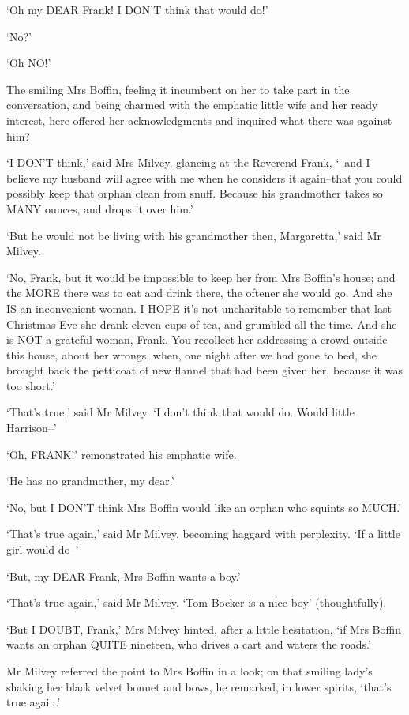 ‘Oh my DEAR Frank! I DON’T think that would do!’

‘No?’

‘Oh NO!’

The smiling Mrs Boffin, feeling it incumbent on her to take part in the
conversation, and being charmed with the emphatic little wife and her
ready interest, here offered her acknowledgments and inquired what there
was against him?

‘I DON’T think,’ said Mrs Milvey, glancing at the Reverend Frank, ‘--and
I believe my husband will agree with me when he considers it again--that
you could possibly keep that orphan clean from snuff. Because his
grandmother takes so MANY ounces, and drops it over him.’

‘But he would not be living with his grandmother then, Margaretta,’ said
Mr Milvey.

‘No, Frank, but it would be impossible to keep her from Mrs Boffin’s
house; and the MORE there was to eat and drink there, the oftener she
would go. And she IS an inconvenient woman. I HOPE it’s not uncharitable
to remember that last Christmas Eve she drank eleven cups of tea, and
grumbled all the time. And she is NOT a grateful woman, Frank. You
recollect her addressing a crowd outside this house, about her wrongs,
when, one night after we had gone to bed, she brought back the petticoat
of new flannel that had been given her, because it was too short.’

‘That’s true,’ said Mr Milvey. ‘I don’t think that would do. Would
little Harrison--’

‘Oh, FRANK!’ remonstrated his emphatic wife.

‘He has no grandmother, my dear.’

‘No, but I DON’T think Mrs Boffin would like an orphan who squints so
MUCH.’

‘That’s true again,’ said Mr Milvey, becoming haggard with perplexity.
‘If a little girl would do--’

‘But, my DEAR Frank, Mrs Boffin wants a boy.’

‘That’s true again,’ said Mr Milvey. ‘Tom Bocker is a nice boy’
(thoughtfully).

‘But I DOUBT, Frank,’ Mrs Milvey hinted, after a little hesitation, ‘if
Mrs Boffin wants an orphan QUITE nineteen, who drives a cart and waters
the roads.’

Mr Milvey referred the point to Mrs Boffin in a look; on that smiling
lady’s shaking her black velvet bonnet and bows, he remarked, in lower
spirits, ‘that’s true again.’

